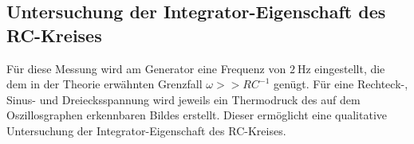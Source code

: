 \subsection{Untersuchung der Integrator-Eigenschaft des RC-Kreises}
Für diese Messung wird am Generator eine Frequenz von $\SI{2}{\hertz}$ eingestellt, die dem in der Theorie erwähnten Grenzfall $\omega>>RC^{-1}$ genügt. Für eine Rechteck-, Sinus- und Dreiecksspannung wird
jeweils ein Thermodruck des auf dem Oszillosgraphen erkennbaren Bildes erstellt. Dieser ermöglicht eine qualitative Untersuchung der
Integrator-Eigenschaft des RC-Kreises.
